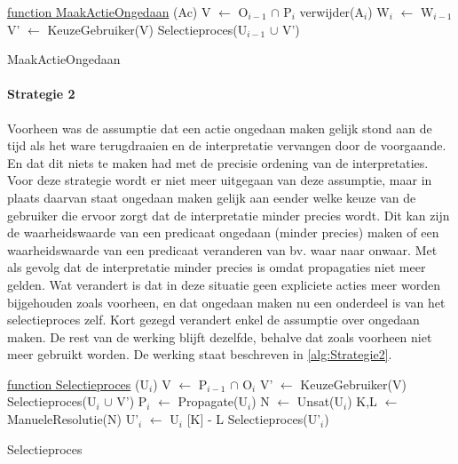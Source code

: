 \begin{algorithm}
	\underline{function MaakActieOngedaan} (Ac)\;
	\Output{}
	V $\leftarrow$ O$_{i-1}$ $\cap$ P$_{i}$\;
	verwijder(A$_{i}$)\;
	W$_{i}$ $\leftarrow$ W$_{i-1}$\;
		{
		V' $\leftarrow$ KeuzeGebruiker(V)\;
			{
			Selectieproces(U$_{i-1}$ $\cup$ V')\;
			}
		}
	\caption{MaakActieOngedaan\label{alg:Strategie1b}}
\end{algorithm}

\paragraph{Strategie 2}
Voorheen was de assumptie dat een actie ongedaan maken gelijk stond aan de tijd als het ware terugdraaien en de interpretatie vervangen door de voorgaande. En dat dit niets te maken had met de precisie ordening van de interpretaties. Voor deze strategie wordt er niet meer uitgegaan van deze assumptie, maar in plaats daarvan staat ongedaan maken gelijk aan eender welke keuze van de gebruiker die ervoor zorgt dat de interpretatie minder precies wordt. Dit kan zijn de waarheidswaarde van een predicaat ongedaan (minder precies) maken of een waarheidswaarde van een predicaat veranderen van bv. waar naar onwaar. Met als gevolg dat de interpretatie minder precies is omdat propagaties niet meer gelden. Wat verandert is dat in deze situatie geen expliciete acties meer worden bijgehouden zoals voorheen, en dat ongedaan maken nu een onderdeel is van het selectieproces zelf. Kort gezegd verandert enkel de assumptie over ongedaan maken. De rest van de werking blijft dezelfde, behalve dat zoals voorheen niet meer gebruikt worden. De werking staat beschreven in \ref{alg:Strategie2}.

\begin{algorithm}
	\underline{function Selectieproces} (U$_{i}$)\;
	\Output{}
		{
		V $\leftarrow$ P$_{i-1}$ $\cap$ O$_{i}$\;
			{
			V' $\leftarrow$ KeuzeGebruiker(V)\; 
			Selectieproces(U$_{i}$ $\cup$ V')\;
			}
			{
			P$_{i}$ $\leftarrow$ Propagate(U$_{i}$)\;	
			}
		}
		{
		N $\leftarrow$ Unsat(U$_{i}$)\; 
		K,L $\leftarrow$ ManueleResolutie(N)\;
		U'$_{i}$ $\leftarrow$ U$_{i}$ 
		[K] - L\; 
		Selectieproces(U'$_{i}$)\;
		}
	\caption{Selectieproces\label{alg:Strategie2}}
\end{algorithm}


